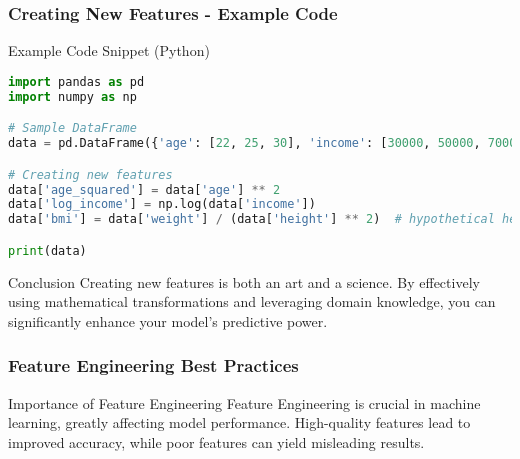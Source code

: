 \documentclass[aspectratio=169]{beamer}
\begin{document}
\begin{frame}[fragile]
    \frametitle{Creating New Features - Example Code}
    \begin{block}{Example Code Snippet (Python)}
        \begin{lstlisting}[language=Python]
import pandas as pd
import numpy as np

# Sample DataFrame
data = pd.DataFrame({'age': [22, 25, 30], 'income': [30000, 50000, 70000]})

# Creating new features
data['age_squared'] = data['age'] ** 2
data['log_income'] = np.log(data['income'])
data['bmi'] = data['weight'] / (data['height'] ** 2)  # hypothetical height and weight columns

print(data)
        \end{lstlisting}
    \end{block}
    
    \begin{block}{Conclusion}
        Creating new features is both an art and a science. By effectively using mathematical transformations and leveraging domain knowledge, you can significantly enhance your model's predictive power.
    \end{block}
\end{frame}

\begin{frame}
    \frametitle{Feature Engineering Best Practices}
    \begin{block}{Importance of Feature Engineering}
        Feature Engineering is crucial in machine learning, greatly affecting model performance. High-quality features lead to improved accuracy, while poor features can yield misleading results.
    \end{block}
\end{frame}
\end{document}

